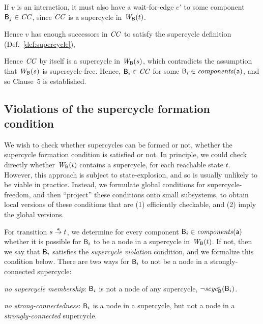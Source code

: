 {If $v$ is an interaction, it must also have a wait-for-edge $e'$ to some component $\B_j \in \CC$, since $\CC$ is
a supercycle in $\wfg{\B}{t}$. 

Hence $v$ has enough successors in $\CC$ to satisfy the supercycle definition (Def.~\ref{def:supercycle}), 

Hence $\CC$ by itself is a supercycle in $\wfg{\B}{s}$,
which contradicts the assumption that 
$\wfg{\B}{s}$ is supercycle-free. Hence, $\B_i \in \CC$ for some $\B_i \in \cmps{\act}$, and so Clause~5 is established.
}





\subsection{Violations of the supercycle formation condition}

We wish to check whether supercycles can be formed or not, \ie whether the supercycle formation
condition is satisfied or not. In principle, we could check directly
whether $\wfg{\B}{t}$ contains a supercycle, for each reachable state
$t$. However, this approach is subject to state-explosion, and so is usually unlikely to be viable in practice.
Instead, we formulate global conditions for supercycle-freedom, and then ``project'' these
conditions onto small subsystems, to obtain local versions of these
conditions that are (1) efficiently checkable, and (2) imply the global versions.

For transition $s \goesto[\act] t$, we determine for every component $\B_i \in \cmps{\act}$ whether
it is possible for $\B_i$ to be a node in a supercycle in $\wfg{\B}{t}$. 
If not, then we say that $\B_i$ satisfies the \emph{supercycle violation} condition, and we formalize this condition below.
%
There are two ways for $\B_i$ to not be a node in a strongly-connected supercycle:
\bn
\item \textit{no supercycle membership}: $\B_i$ is not a node of any supercycle, \ie $\neg \scyc{\B}{s}{\B_i}$.

\item \textit{no strong-connectedness}: $\B_i$ is a node in a supercycle, but not a node in a \emph{strongly-connected} supercycle. 

\en







